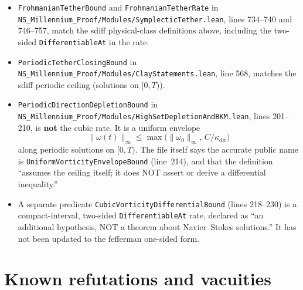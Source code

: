 \documentclass[11pt]{article}
\theoremstyle{plain}
\theoremstyle{definition}
\theoremstyle{remark}
\begin{document}
{\sloppy\begin{itemize}[leftmargin=1.4em]
\item \texttt{FrohmanianTetherBound} and \texttt{FrohmanianTetherRate} in \texttt{NS\_\hspace{0pt}Millennium\_\hspace{0pt}Proof/\hspace{0pt}Modules/\hspace{0pt}SymplecticTether.\hspace{0pt}lean}, lines 734--740 and 746--757, match the sdiff physical-class definitions above, including the two-sided \texttt{DifferentiableAt} in the rate.
\item \texttt{PeriodicTetherClosingBound} in \texttt{NS\_\hspace{0pt}Millennium\_\hspace{0pt}Proof/\hspace{0pt}Modules/\hspace{0pt}ClayStatements.\hspace{0pt}lean}, line 568, matches the sdiff periodic ceiling (solutions on \([0,T)\)).
\item \texttt{PeriodicDirectionDepletionBound} in \texttt{NS\_\hspace{0pt}Millennium\_\hspace{0pt}Proof/\hspace{0pt}Modules/\hspace{0pt}HighSetDepletionAndBKM.\hspace{0pt}lean}, lines 201--210, is \textbf{not} the cubic rate. It is a uniform envelope
\[
\|\omega(t)\|_{\infty}\le \max\bigl(\|\omega_{0}\|_{\infty},\, C/\kappa_{\mathrm{dir}}\bigr)
\]
along periodic solutions on \([0,T)\). The file itself says the accurate public name is \texttt{UniformVorticityEnvelopeBound} (line~214), and that the definition ``assumes the ceiling itself; it does NOT assert or derive a differential inequality.''
\item A separate predicate \texttt{CubicVorticityDifferentialBound} (lines 218--230) is a compact-interval, two-sided \texttt{DifferentiableAt} rate, declared as ``an additional hypothesis, NOT a theorem about Navier--Stokes solutions.'' It has not been updated to the fefferman one-sided form.
\end{itemize}}

\section{Known refutations and vacuities}
\label{sec:refutations}
\end{document}
